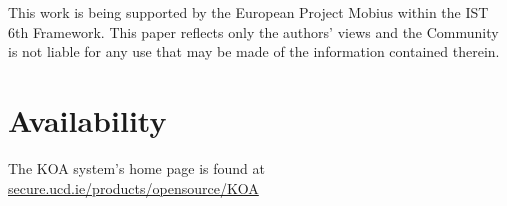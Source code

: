 \documentclass[letterpaper,twocolumn,10pt]{article}
\begin{document}
This work is being supported by the European Project Mobius within the IST 6th
Framework. %
This paper reflects only the authors' views and the Community is not liable for
any use that may be made of the information contained therein.

\section{Availability}

The KOA system's home page is found at
{\url{secure.ucd.ie/products/opensource/KOA}}

% 
{\footnotesize 
  
}


\end{document}
